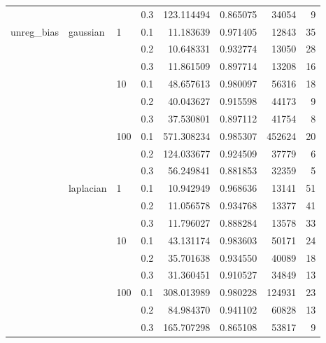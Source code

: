 \begin{table}[H]
\begin{tabular}{llllrrrr}
           &           &     & 0.3 &  123.114494 &  0.865075 &   34054 &     9 \\
unreg\_bias & gaussian & 1   & 0.1 &   11.183639 &  0.971405 &   12843 &    35 \\
           &           &     & 0.2 &   10.648331 &  0.932774 &   13050 &    28 \\
           &           &     & 0.3 &   11.861509 &  0.897714 &   13208 &    16 \\
           &           & 10  & 0.1 &   48.657613 &  0.980097 &   56316 &    18 \\
           &           &     & 0.2 &   40.043627 &  0.915598 &   44173 &     9 \\
           &           &     & 0.3 &   37.530801 &  0.897112 &   41754 &     8 \\
           &           & 100 & 0.1 &  571.308234 &  0.985307 &  452624 &    20 \\
           &           &     & 0.2 &  124.033677 &  0.924509 &   37779 &     6 \\
           &           &     & 0.3 &   56.249841 &  0.881853 &   32359 &     5 \\
           & laplacian & 1   & 0.1 &   10.942949 &  0.968636 &   13141 &    51 \\
           &           &     & 0.2 &   11.056578 &  0.934768 &   13377 &    41 \\
           &           &     & 0.3 &   11.796027 &  0.888284 &   13578 &    33 \\
           &           & 10  & 0.1 &   43.131174 &  0.983603 &   50171 &    24 \\
           &           &     & 0.2 &   35.701638 &  0.934550 &   40089 &    18 \\
           &           &     & 0.3 &   31.360451 &  0.910527 &   34849 &    13 \\
           &           & 100 & 0.1 &  308.013989 &  0.980228 &  124931 &    23 \\
           &           &     & 0.2 &   84.984370 &  0.941102 &   60828 &    13 \\
           &           &     & 0.3 &  165.707298 &  0.865108 &   53817 &     9 \\
\bottomrule
\end{tabular}
\end{table}
